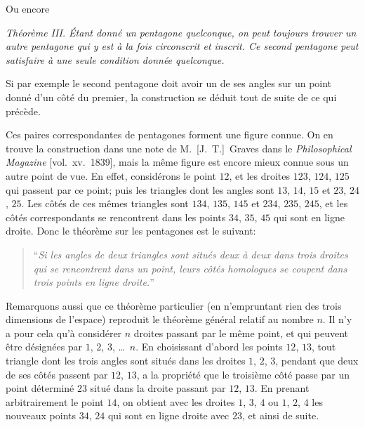 \documentclass[12pt,a4paper]{article}
\theoremstyle{plain}
\begin{document}
Ou encore

\smallskip
\textit{Th\'eor\`eme III. \'Etant donn\'e un pentagone quelconque, on peut toujours trouver un autre pentagone qui y est \`a la fois circonscrit et inscrit. Ce second pentagone peut satisfaire \`a une seule condition donn\'ee quelconque.}
\smallskip

Si par exemple le second pentagone doit avoir un de ses angles sur un point donn\'e d'un c\^ot\'e du premier, la construction se d\'eduit tout de suite de ce qui pr\'ec\`ede.

Ces paires correspondantes de pentagones forment une figure connue. On en trouve la construction dans une note de M.~[J.~T.]~Graves dans le \textit{Philosophical Magazine} [vol.\ xv.~1839], mais la m\^eme figure est encore mieux connue sous un autre point de vue. En effet, consid\'erons le point $12$, et les droites $123$, $124$, $125$ qui passent par ce point; puis les triangles dont les angles sont $13$, $14$, $15$ et $23$, $24$, $25$. Les c\^ot\'es de ces m\^emes triangles sont $134$, $135$, $145$ et $234$, $235$, $245$, et les c\^ot\'es correspondants se rencontrent dans les points $34$, $35$, $45$ qui sont en ligne droite. Donc le th\'eor\`eme sur les pentagones est le suivant:

\begin{quote}
``\textit{Si les angles de deux triangles sont situ\'es deux \`a deux dans trois droites qui se rencontrent dans un point, leurs c\^ot\'es homologues se coupent dans trois points en ligne droite.}''
\end{quote}

Remarquons aussi que ce th\'eor\`eme particulier (en n'empruntant rien des trois dimensions de l'espace) reproduit le th\'eor\`eme g\'en\'eral relatif au nombre $n$. Il n'y a pour cela qu'\`a consid\'erer $n$ droites passant par le m\^eme point, et qui peuvent \^etre d\'esign\'ees par $1$, $2$, $3$, \ldots\ $n$. En choisissant d'abord les points $12$, $13$, tout triangle dont les trois angles sont situ\'es dans les droites $1$, $2$, $3$, pendant que deux de ses c\^ot\'es passent par $12$, $13$, a la propri\'et\'e que le troisi\`eme c\^ot\'e passe par un point d\'etermin\'e $23$ situ\'e dans la droite passant par $12$, $13$. En prenant arbitrairement le point $14$, on obtient avec les droites $1$, $3$, $4$ ou $1$, $2$, $4$ les nouveaux points $34$, $24$ qui sont en ligne droite avec $23$, et ainsi de suite.
\end{document}
